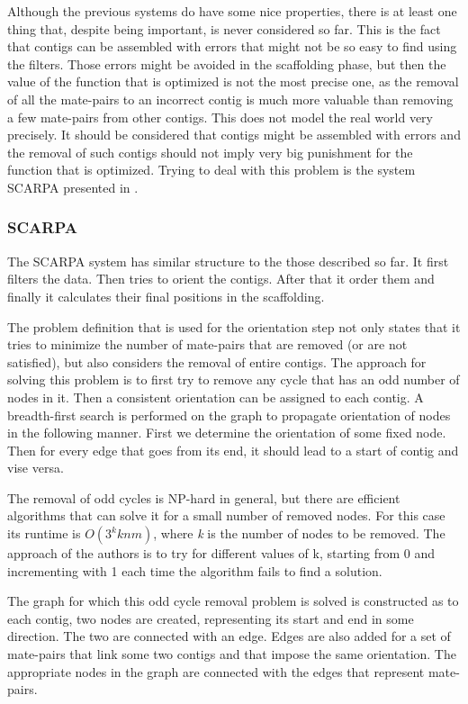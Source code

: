 \documentclass[11pt]{article}
\begin{document}
Although the previous systems do have some nice properties, there is at least
one thing that, despite being important, is never considered so far. This is the
fact that contigs can be assembled with errors that might not be so easy to find
using the filters. Those errors might be avoided in the scaffolding phase, but
then the value of the function that is optimized is not the most precise one, as
the removal of all the mate-pairs to an incorrect contig is much more valuable
than removing a few mate-pairs from other contigs. This does not model the real
world very precisely. It should be considered that contigs might be assembled
with errors and the removal of such contigs should not imply very big punishment
for the function that is optimized. Trying to deal with this problem is the
system SCARPA presented in \cite{SCARPA}.

\subsubsection{SCARPA} %
\label{ssub:SCARPA}
The SCARPA system has similar structure to the those described so far. It first
filters the data. Then tries to orient the contigs. After that it order them and
finally it calculates their final positions in the scaffolding. 

The problem definition that is used for the orientation step not only states
that it tries to minimize the number of mate-pairs that are removed (or are not
satisfied), but also considers the removal of entire contigs. The approach for
solving this problem is to first try to remove any cycle that has an odd number
of nodes in it. Then a consistent orientation can be assigned to each
contig. A breadth-first search is performed on the graph to propagate
orientation of nodes in the following manner. First we determine the orientation
of some fixed node. Then for every edge that goes from its end, it should lead
to a start of contig and vise versa.

The removal of odd cycles is NP-hard in general, but there are efficient
algorithms that can solve it for a small number of removed nodes. For this case
its runtime is $O(3^k k n m )$, where \emph{k} is the number of nodes to be
removed. The approach of the authors is to try for different values of k,
starting from 0 and incrementing with 1 each time the algorithm fails to find a
solution.

The graph for which this odd cycle removal problem is solved is constructed as
to each contig, two nodes are created, representing its start and end in some
direction. The two are connected with an edge. Edges are also added for a set of
mate-pairs that link some two contigs and that impose the same orientation. The
appropriate nodes in the graph are connected with the edges that represent
mate-pairs. 
\end{document}
